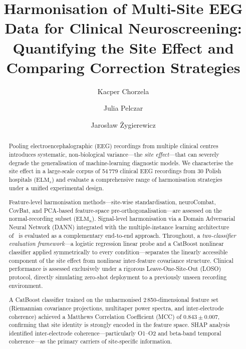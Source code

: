 \documentclass[preprint,12pt]{elsarticle}
\begin{document}
\begin{frontmatter}

\title{Harmonisation of Multi-Site EEG Data for Clinical Neuroscreening:
       Quantifying the Site Effect and Comparing Correction Strategies}

\author[aff1]{Kacper Chorzela}
\author[aff1]{Julia Pelczar}
\author[aff1]{Jaros\l{}aw {\.Z}ygierewicz}



\begin{abstract}
Pooling electroencephalographic (EEG) recordings from multiple clinical
centres introduces systematic, non-biological variance---the
\emph{site effect}---that can severely degrade the generalisation of
machine-learning diagnostic models.
We characterise the site effect in a large-scale corpus of 54\,779
clinical EEG recordings from 30 Polish hospitals
($\mathrm{ELM}_s$) and evaluate a comprehensive range of
harmonisation strategies under a unified experimental design.

Feature-level harmonisation methods---site-wise standardisation,
neuroCombat, CovBat, and PCA-based feature-space
pre-orthogonalisation---are assessed on the normal-recording subset
($\mathrm{ELM}_n$).
Signal-level harmonisation via a Domain Adversarial Neural Network
(DANN) integrated with the multiple-instance learning architecture
of~\cite{poziomska2026quantity} is evaluated as a complementary
end-to-end approach.
Throughout, a \emph{two-classifier evaluation framework}---a logistic
regression linear probe and a CatBoost nonlinear classifier applied
symmetrically to every condition---separates the linearly accessible
component of the site effect from nonlinear inter-feature covariance
structure.
Clinical performance is assessed exclusively under a rigorous
Leave-One-Site-Out (LOSO) protocol, directly simulating zero-shot
deployment to a previously unseen recording environment.

A CatBoost classifier trained on the unharmonised 2\,850-dimensional
feature set (Riemannian covariance projections, multitaper power
spectra, and inter-electrode coherence) achieved a Matthews
Correlation Coefficient (MCC) of $0.843 \pm 0.007$, confirming that
site identity is strongly encoded in the feature space.
SHAP analysis identified inter-electrode coherence---particularly
O1--O2 and beta-band temporal coherence---as the primary carriers
of site-specific information.


\end{abstract}
\end{frontmatter}
\end{document}
